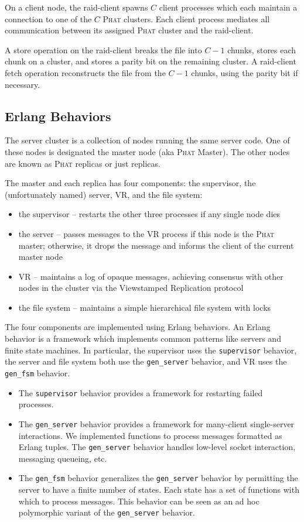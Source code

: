 \documentclass[10pt,letter]{article}
\newcommand{\phat}[0]{\textsc{Phat}}
\begin{document}
On a client node, the raid-client spawns $C$ client processes which each
maintain a connection to one of the $C$ \phat{} clusters. Each client process
mediates all communication between its assigned \phat{} cluster and the
raid-client.

A store operation on the raid-client breaks the file into $C-1$ chunks, stores
each chunk on a cluster, and stores a parity bit on the remaining cluster. A
raid-client fetch operation reconstructs the file from the $C-1$ chunks, using
the parity bit if necessary.

\subsection{Erlang Behaviors}

The server cluster is a collection of nodes running the same server code. One of
these nodes is designated the master node (aka \phat{} Master). The other nodes are
known as \phat{} replicas or just replicas.

The master and each replica has four components: the supervisor, the
(unfortunately named) server, VR, and the file system:

\begin{itemize}
\item the supervisor -- restarts the other three processes if any single node dies
\item the server -- passes messages to the VR process if this node is the
  \phat{} master; otherwise, it drops the message and informs the client of the
  current master node
\item VR -- maintains a log of opaque messages, achieving consensus with other
  nodes in the cluster via the Viewstamped Replication protocol
\item the file system -- maintains a simple hierarchical file system with locks
\end{itemize}

The four components are implemented using Erlang behaviors. An Erlang behavior
is a framework which implements common patterns like servers and finite state
machines. In particular, the supervisor uses the \texttt{supervisor} behavior,
the server and file system both use the \texttt{gen\_server} behavior, and VR
uses the \texttt{gen\_fsm} behavior.

\begin{itemize}
\item The \texttt{supervisor} behavior provides a framework for restarting
  failed processes.
\item The \texttt{gen\_server} behavior provides a framework for many-client
  single-server interactions. We implemented functions to process messages
  formatted as Erlang tuples. The \texttt{gen\_server} behavior handles
  low-level socket interaction, messaging queueing, etc.
\item The \texttt{gen\_fsm} behavior generalizes the \texttt{gen\_server}
  behavior by permitting the server to have a finite number of states. Each
  state has a set of functions with which to process messages. This behavior can
  be seen as an ad hoc polymorphic variant of the \texttt{gen\_server} behavior.
\end{itemize}
\end{document}
